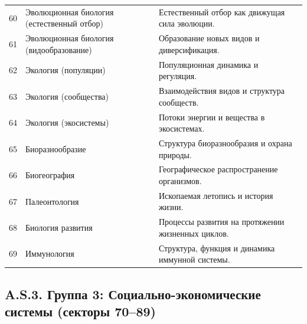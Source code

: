 \documentclass[11pt,a4paper]{article}
\begin{document}
\begin{longtable}{|p{0.9cm}|p{6.0cm}|p{8.6cm}|}
		60 & Эволюционная биология (естественный отбор) & Естественный отбор как движущая сила эволюции. \\
		61 & Эволюционная биология (видообразование) & Образование новых видов и диверсификация. \\
		62 & Экология (популяции) & Популяционная динамика и регуляция. \\
		63 & Экология (сообщества) & Взаимодействия видов и структура сообществ. \\
		64 & Экология (экосистемы) & Потоки энергии и вещества в экосистемах. \\
		65 & Биоразнообразие & Структура биоразнообразия и охрана природы. \\
		66 & Биогеография & Географическое распространение организмов. \\
		67 & Палеонтология & Ископаемая летопись и история жизни. \\
		68 & Биология развития & Процессы развития на протяжении жизненных циклов. \\
		69 & Иммунология & Структура, функция и динамика иммунной системы. \\
	\end{longtable}
	
	\subsection*{A.S.3. Группа 3: Социально-экономические системы (секторы 70--89)}
	
\end{document}
